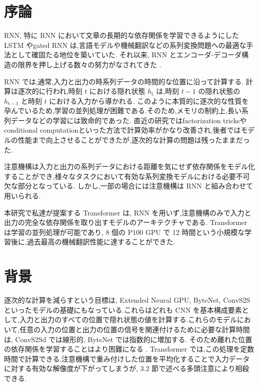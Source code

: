 \documentclass{jarticle}     %
\begin{document}
\section{序論}
RNN, 特に RNN において文章の長期的な依存関係を学習できるようにした LSTM\cite{LSTM,12} やgated RNN \cite{GRU,7} は,言語モデルや機械翻訳\cite{29,2,5}などの系列変換問題への最適な手法として確固たる地位を築いていた.
それ以来, RNN とエンコーダ-デコーダ構造の限界を押し上げる数々の努力がなされてきた \cite{31,21,13}.
\par
RNN では,通常,入力と出力の時系列データの時間的な位置に沿って計算する.
計算は逐次的に行われ,時刻 $t$ における隠れ状態 $h_\mathrm{t}$ は,時刻 $t-1$ の隠れ状態の $h_\mathrm{t-1}$ と時刻 $t$ における入力から導かれる.
このように本質的に逐次的な性質を孕んでいるため,学習の並列処理が困難である.そのため,メモリの制約上,長い系列データなどの学習には致命的であった.
直近の研究ではfactorization tricks\cite{18}やconditional computation\cite{26}といった方法で計算効率がかなり改善され,後者ではモデルの性能まで向上させることができたが,逐次的な計算の問題は残ったままだった.\par
注意機構は入力と出力の系列データにおける距離を気にせず依存関係をモデル化することができ,様々なタスクにおいて有効な系列変換モデルにおける必要不可欠な部分となっている\cite{2,16}. しかし,一部の場合\cite{22}には注意機構は RNN と組み合わせて用いられる.\par
本研究で私達が提案する Transformer は, RNN を用いず,注意機構のみで入力と出力の完全な依存関係を取り出すモデルのアーキテクチャである.
 Transformer は学習の並列処理が可能であり, 8 個の P100 GPU で 12 時間という小規模な学習後に,過去最高の機械翻訳性能に達することができた.


\section{背景}
逐次的な計算を減らすという目標は, Extended Neural GPU\cite{20}, ByteNet\cite{15}, ConvS2S\cite{8} といったモデルの基礎にもなっている.これらはどれも CNN を基本構成要素として,入力と出力のすべての位置で隠れ状態の値を計算する.これらのモデルにおいて,任意の入力の位置と出力の位置の信号を関連付けるために必要な計算時間は, ConvS2Sd では線形的, ByteNet では指数的に増加する.
そのため離れた位置の依存関係を学習することはより困難になる \cite{11}.
 Transformer では,この処理を定数時間で計算できる.注意機構で重み付けした位置を平均化することで入力データに対する有効な解像度が下がってしまうが, 3.2 節で述べる多頭注意により相殺できる.\par
\end{document}
